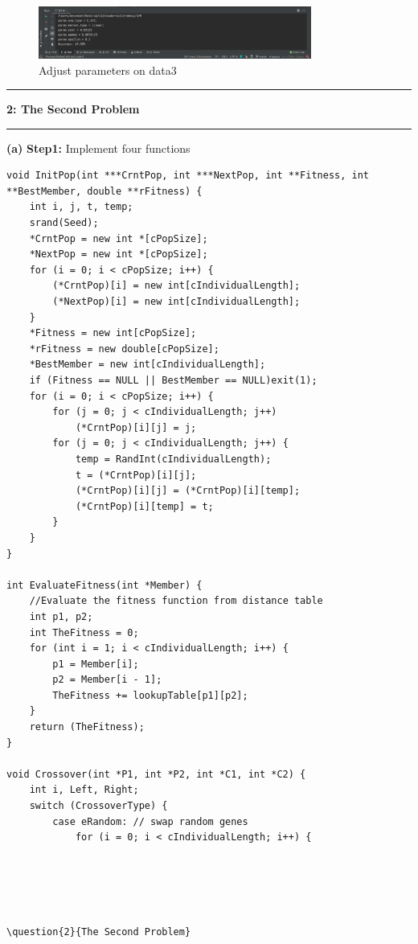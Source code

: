 \documentclass[11pt]{article}
\newcommand\question[2]{\vspace{.25in}\hrule\textbf{#1: #2}\vspace{.5em}\hrule\vspace{.10in}}
\renewcommand\part[1]{\vspace{.10in}\textbf{(#1)}}
\newcommand\one{\vspace{.10in}\textbf{Step1: }}
\begin{document}
\begin{figure}[H]
    \centering
    \includegraphics[width=0.8\textwidth]{d3p3}
    \caption{Adjust parameters on data3}
\end{figure}




\question{2}{The Second Problem} 

\part{a} \one Implement four functions
\begin{lstlisting}
void InitPop(int ***CrntPop, int ***NextPop, int **Fitness, int **BestMember, double **rFitness) {
    int i, j, t, temp;
    srand(Seed);
    *CrntPop = new int *[cPopSize];
    *NextPop = new int *[cPopSize];
    for (i = 0; i < cPopSize; i++) {
        (*CrntPop)[i] = new int[cIndividualLength];
        (*NextPop)[i] = new int[cIndividualLength];
    }
    *Fitness = new int[cPopSize];
    *rFitness = new double[cPopSize];
    *BestMember = new int[cIndividualLength];
    if (Fitness == NULL || BestMember == NULL)exit(1);
    for (i = 0; i < cPopSize; i++) {
        for (j = 0; j < cIndividualLength; j++)
            (*CrntPop)[i][j] = j;
        for (j = 0; j < cIndividualLength; j++) {
            temp = RandInt(cIndividualLength);
            t = (*CrntPop)[i][j];
            (*CrntPop)[i][j] = (*CrntPop)[i][temp];
            (*CrntPop)[i][temp] = t;
        }
    }
}

int EvaluateFitness(int *Member) {
    //Evaluate the fitness function from distance table
    int p1, p2;
    int TheFitness = 0;
    for (int i = 1; i < cIndividualLength; i++) {
        p1 = Member[i];
        p2 = Member[i - 1];
        TheFitness += lookupTable[p1][p2];
    }
    return (TheFitness);
}

void Crossover(int *P1, int *P2, int *C1, int *C2) {
    int i, Left, Right;
    switch (CrossoverType) {
        case eRandom: // swap random genes
            for (i = 0; i < cIndividualLength; i++) {





\question{2}{The Second Problem} 


\end{lstlisting}
\end{document}
